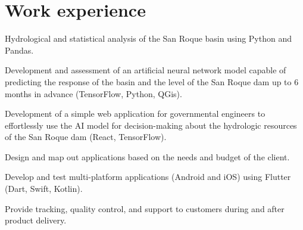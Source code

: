 \documentclass[]{robertino-cv}
\begin{document}
%
%
\lastupdated

%
%

%
%
\begin{minipage}[t]{0.48\textwidth} 


\section{Work experience} 

\begin{tightemize}
\vspace{\topsep} %
\item Hydrological and statistical analysis of the San Roque basin using Python and Pandas.
\item Development and assessment of an artificial neural network model capable of predicting the response of the basin and the level of the San Roque dam up to 6 months in advance (TensorFlow, Python, QGis).
\item Development of a simple web application for governmental engineers to effortlessly use the AI model for decision-making about the hydrologic resources of the San Roque dam (React, TensorFlow).
\end{tightemize}
\sectionsep

\begin{tightemize}
\item Design and map out applications based on the needs and budget of the client.
\item Develop and test multi-platform applications (Android and iOS) using Flutter (Dart, Swift, Kotlin).
\item Provide tracking, quality control, and support to customers during and after product delivery.
\end{tightemize}
\sectionsep


\end{minipage}
\end{document}
